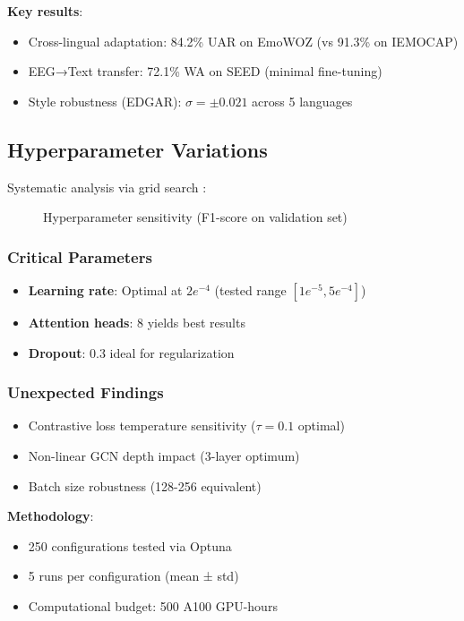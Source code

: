 \documentclass[a4paper,11pt]{article}
\begin{document}
\textbf{Key results}:
\begin{itemize}
    \item Cross-lingual adaptation: 84.2\% UAR on EmoWOZ (vs 91.3\% on IEMOCAP)
    \item EEG→Text transfer: 72.1\% WA on SEED (minimal fine-tuning)
    \item Style robustness (EDGAR): $\sigma=\pm0.021$ across 5 languages
\end{itemize}

\subsection{Hyperparameter Variations}
Systematic analysis via grid search \cite{bergstra2012random}:

\begin{figure}[h]
\centering
\caption{Hyperparameter sensitivity (F1-score on validation set)}
\label{fig:hyperparams}
\end{figure}

\subsubsection{Critical Parameters}
\begin{itemize}
    \item \textbf{Learning rate}: Optimal at $2e^{-4}$ (tested range $[1e^{-5}, 5e^{-4}]$)
    \item \textbf{Attention heads}: 8 yields best results
    \item \textbf{Dropout}: 0.3 ideal for regularization
\end{itemize}

\subsubsection{Unexpected Findings}
\begin{itemize}
    \item Contrastive loss temperature sensitivity ($\tau=0.1$ optimal)
    \item Non-linear GCN depth impact (3-layer optimum)
    \item Batch size robustness (128-256 equivalent)
\end{itemize}

\textbf{Methodology}:
\begin{itemize}
    \item 250 configurations tested via Optuna \cite{akiba2019optuna}
    \item 5 runs per configuration (mean ± std)
    \item Computational budget: 500 A100 GPU-hours
\end{itemize}
\end{document}
